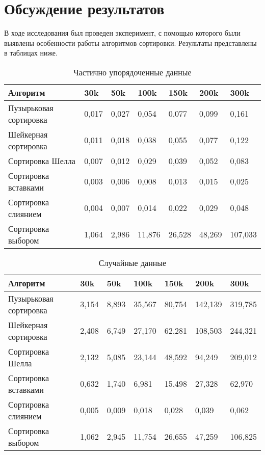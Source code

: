 \section{Обсуждение результатов}
В ходе исследования был проведен эксперимент, с помощью которого были
выявлены особенности работы алгоритмов сортировки. Результаты представлены в 
таблицах ниже.
\begin{table}[h]
\caption{Частично упорядоченные данные}
\centering
  \begin{tabular}{ | l | l | l | l | l | l | l |}
  \hline
    Алгоритм & 30k & 50k & 100k & 150k & 200k & 300k \\ \hline
    Пузырьковая сортировка & 0,017 & 0,027 & 0,054 & 0,077 & 0,099 & 0,161 \\ \hline
    Шейкерная сортировка & 0,011 & 0,018 & 0,038 & 0,055 & 0,077 & 0,122 \\ \hline
    Сортировка Шелла & 0,007 & 0,012 & 0,029 &  0,039 & 0,052 & 0,083 \\ \hline
    Сортировка вставками & 0,003 & 0,006 & 0,008 & 0,013 & 0,015 & 0,025 \\ \hline
    Сортировка слиянием & 0,004 & 0,007 & 0,014 & 0,022 & 0,029 & 0,048 \\ \hline
    Сортировка выбором & 1,064 & 2,986 & 11,876 & 26,528 & 48,269 & 107,033 \\ \hline
    \end{tabular}
\end{table}

\begin{table}[h]
\caption{Случайные данные}
\centering
  \begin{tabular}{ | l | l | l | l | l | l | l |}
  \hline
    Алгоритм & 30k & 50k & 100k & 150k & 200k & 300k \\ \hline
    Пузырьковая сортировка & 3,154 & 8,893 & 35,567 & 80,754 & 142,139 & 319,785 \\ \hline
    Шейкерная сортировка & 2,408 & 6,749 & 27,170 & 62,281 & 108,503 & 244,321 \\ \hline
    Сортировка Шелла & 2,132 & 5,085 & 23,144 & 48,592  & 94,249 & 209,012 \\ \hline
    Сортировка вставками & 0,632 & 1,740 & 6,981 & 15,498 & 27,328 & 62,970 \\ \hline
    Сортировка слиянием & 0,005 & 0,009 & 0,018 & 0,028 & 0,039 & 0,062 \\ \hline
    Сортировка выбором & 1,062 & 2,945 & 11,754 & 26,655 & 47,259 & 106,825 \\ \hline
    \end{tabular}
\end{table}

